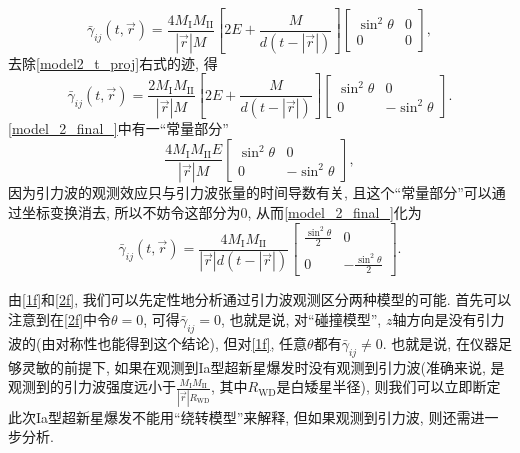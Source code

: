 \documentclass[12pt]{ctexart}
\begin{document}
\begin{equation}
    \bar{\gamma}_{ij}(t,\vec{r})=\frac{4M_\text{I}M_\text{II}}{\left\lvert\vec{r}\right\rvert M}\left[2E+\frac{M}{d(t-\left\lvert\vec{r}\right\rvert)}\right]
    \begin{bmatrix}
        \sin^2\theta&0\\
        0&0
    \end{bmatrix},\label{model2_t_proj}
\end{equation}
去除\eqref{model2_t_proj}右式的迹, 得
\begin{equation}
    \bar{\gamma}_{ij}(t,\vec{r})=\frac{2M_\text{I}M_\text{II}}{\left\lvert\vec{r}\right\rvert M}\left[2E+\frac{M}{d(t-\left\lvert\vec{r}\right\rvert)}\right]
    \begin{bmatrix}
        \sin^2\theta&0\\
        0&-\sin^2\theta
    \end{bmatrix}.\label{model_2_final_}
\end{equation}
\eqref{model_2_final_}中有一``常量部分''
\begin{equation}
    \frac{4M_\text{I}M_\text{II}E}{\left\lvert\vec{r}\right\rvert M}
    \begin{bmatrix}
        \sin^2\theta&0\\
        0&-\sin^2\theta
    \end{bmatrix},
\end{equation}
因为引力波的观测效应只与引力波张量的时间导数有关\cite{Wald1984,Sathyaprakash2009}, 且这个``常量部分''可以通过坐标变换消去\cite{Wald1984}, 所以不妨令这部分为$0$, 从而\eqref{model_2_final_}化为
\begin{equation}
    \bar{\gamma}_{ij}(t,\vec{r})=\frac{4M_\text{I}M_\text{II}}{\left\lvert\vec{r}\right\rvert d(t-\left\lvert\vec{r}\right\rvert)}
    \begin{bmatrix}
        \frac{\sin^2\theta}{2}&0\\
        0&-\frac{\sin^2\theta}{2}
    \end{bmatrix}.\label{2f}
\end{equation}

由\eqref{1f}和\eqref{2f}, 我们可以先定性地分析通过引力波观测区分两种模型的可能. 首先可以注意到在\eqref{2f}中令$\theta=0$, 可得$\bar{\gamma}_{ij}=0$, 也就是说, 对``碰撞模型'', $z$轴方向是没有引力波的(由对称性也能得到这个结论), 但对\eqref{1f}, 任意$\theta$都有$\bar{\gamma}_{ij}\ne0$. 也就是说, 在仪器足够灵敏的前提下, 如果在观测到Ia型超新星爆发时没有观测到引力波(准确来说, 是观测到的引力波强度远小于$\frac{M_\text{I}M_\text{II}}{\left\lvert\vec{r}\right\rvert R_\text{WD}}$, 其中$R_\text{WD}$是白矮星半径), 则我们可以立即断定此次Ia型超新星爆发不能用``绕转模型''来解释, 但如果观测到引力波, 则还需进一步分析.
\end{document}

